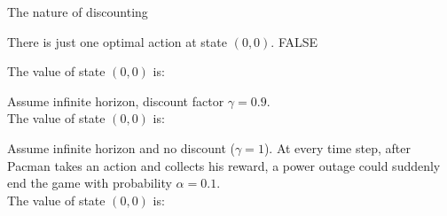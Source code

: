 \begin{problem}[]{The nature of discounting}
\begin{question}
{
\renewcommand\truefalsepoints{2}
\begin{truefalse}[\TwoCi]
There is just one optimal action at state $(0,0)$. FALSE
\end{truefalse}}

\begin{subquestion}[2]
The value of state $(0,0)$ is: \underline{\hspace{1cm}\TwoCii\hspace{1cm}}  
\end{subquestion}


\end{question}

\begin{question}[2]
Assume infinite horizon, discount factor $\gamma = 0.9$. 
\\

The value of state $(0,0)$ is: \underline{\hspace{1cm}\TwoD\hspace{1cm}}  \hfill \hfill
\\

\end{question}


\begin{question}[2]
Assume infinite horizon and no discount ($\gamma = 1$). At every time step, after Pacman takes an action and collects his reward, a power outage could suddenly end the game with probability $\alpha= 0.1$. \\

The value of state $(0,0)$ is: \underline{\hspace{1cm}\TwoE\hspace{1cm}} 

\end{question}
\end{problem}